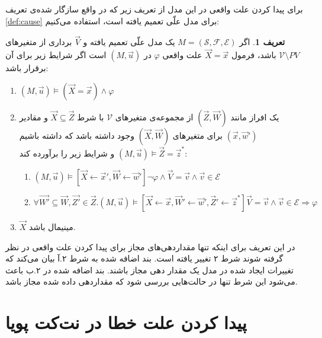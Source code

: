 \documentclass[
msc,
irfonts
]{./tex/tehran-thesis}
\newcommand{\پ}{پروژه/پایان‌نامه/رساله }
\theoremstyle{definition}
\newtheorem{definition}{تعریف}[section]
\theoremstyle{theorem}
\theoremstyle{definition}
\numberwithin{algorithm}{chapter}
\newcommand{\la}{\leftarrow}
\newcommand{\mc}[1]{\mathcal{#1}}
\begin{document}
برای پیدا کردن علت واقعی در این مدل از تعریف زیر که در واقع سازگار شده‌ی تعریف
\ref{def:cause}
برای مدل‌ علّی تعمیم یافته است، استفاده می‌کنیم:

\begin{definition}
    \label{def:extended}
    اگر
    $M = (\mc{S},\mc{F},\mc{E})$
    یک مدل علّی تعمیم یافته و
    $\vec V$
    برداری از متغیر‌های
    $\mathcal{V} \setminus PV$
    باشد،
    فرمول
    $\vec X = \vec x$
    علت واقعی
    $\varphi$
    در
    $(M,\vec{u})$
    است
    اگر شرایط زیر برای آن برقرار باشد:
    \begin{enumerate}
        \item $(M,\vec{u}) \vDash (\vec{X} = \vec{x}) \wedge \varphi$
        \item یک افراز مانند
              $(\vec{Z},\vec{W})$
              از مجموعه‌ی متغیر‌های
              $\mc{V}$
              با شرط
              $\vec{X} \subseteq \vec{Z}$
              و مقادیر
              $(\vec{x},\vec{w}')$
              برای متغیر‌های
              $(\vec{X},\vec{W})$
              وجود داشته باشد که داشته باشیم
              $(M,\vec{u})\vDash \vec{Z} = \vec{z}^*$
              و شرایط زیر را برآورده کند:
              \begin{enumerate}
                  \item $(M,\vec u)\vDash
                  [\vec{X}\la\vec{x}',\vec{W}\la\vec{w}'] 
                  \neg \varphi \wedge \vec V = \vec v 
                  \wedge \vec v \in \mc E$
                  \item $\forall \vec{W'} \subseteq \vec{W},\vec{Z'}\in \vec{Z}.
                            (M,\vec{u})\vDash [\vec X\la\vec x,\vec{W}'\la \vec{w}',\vec{Z}'\la \vec{z}^*]
                            \vec V = \vec v \wedge \vec v \in \mc{E}
                            \Rightarrow \varphi$
              \end{enumerate}
        \item $\vec X$
              مینیمال باشد.
    \end{enumerate}
\end{definition}
در این تعریف برای اینکه تنها مقداردهی‌های مجاز برای پیدا کردن علت واقعی در نظر گرفته شوند شرط ۲ تغییر یافته است.
بند اضافه شده به شرط ۲.آ بیان می‌کند که تغییرات ایجاد شده در مدل یک مقدار دهی مجاز باشند.
بند اضافه شده در ۲.ب باعث می‌شود این شرط تنها در حالت‌هایی بررسی شود که مقداردهی داده شده مجاز باشد.
 
\section{پیدا کردن علت خطا در نت‌کت پویا}
\end{document}
